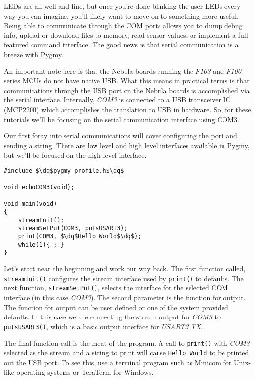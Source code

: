 \documentclass{article}
\newcommand{\dq}{\textquotedbl}
\begin{document}
LEDs are all well and fine, but once you're done blinking the user LEDs every way you can imagine, you'll likely want to move on to something more useful. Being able to communicate through the COM ports allows you to dump debug info, upload or download files to memory, read sensor values, or implement a full-featured command interface. The good news is that serial communication is a breeze with Pygmy.

An important note here is that the Nebula boards running the \emph{F103} and \emph{F100} series MCUs do not have native USB. What this means in practical terms is that communications through the USB port on the Nebula boards is accomplished via the serial interface. Internally, \emph{COM3} is connected to a USB transceiver IC (MCP2200) which accomplishes the translation to USB in hardware. So, for these tutorials we'll be focusing on the serial communication interface using COM3.

Our first foray into serial communications will cover configuring the port and sending a string. There are low level and high level interfaces available in Pygmy, but we'll be focused on the high level interface.

\begin{lstlisting}
#include $\dq$pygmy_profile.h$\dq$

void echoCOM3(void);

void main(void)
{
	streamInit();
	streamSetPut(COM3, putsUSART3);
	print(COM3, $\dq$Hello World$\dq$);
	while(1){ ; }
}
\end{lstlisting}

Let's start near the beginning and work our way back. The first function called, \verb|streamInit()| configures the stream interface used by \verb|print()| to defaults. The next function, \verb|streamSetPut()|, selects the interface for the selected COM interface (in this case \emph{COM3}). The second parameter is the function for output. The function for output can be user defined or one of the system provided defaults. In this case we are connecting the stream output for \emph{COM3} to \verb|putsUSART3()|, which is a basic output interface for \emph{USART3 TX}.

The final function call is the meat of the program. A call to \verb|print()| with \emph{COM3} selected as the stream and a string to print will cause \verb|Hello World| to be printed out the USB port. To see this, use a terminal program such as Minicom for Unix-like operating systems or TeraTerm for Windows\textsuperscript{\textregistered}.
\end{document}
